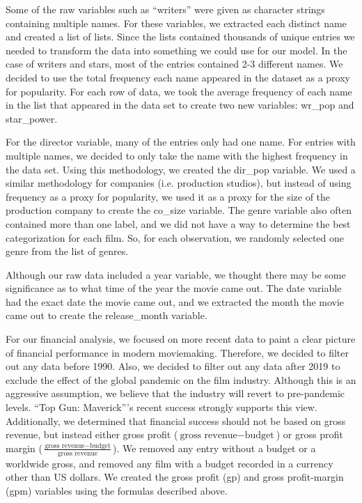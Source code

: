 \documentclass[10pt]{article}
\begin{document}
Some of the raw variables such as “writers” were given as character strings containing multiple names. For these variables, we extracted each distinct name and created a list of lists. Since the lists contained thousands of unique entries we needed to transform the data into something we could use for our model. In the case of writers and stars, most of the entries contained 2-3 different names. We decided to use the total frequency each name appeared in the dataset as a proxy for popularity. For each row of data, we took the average frequency of each name in the list that appeared in the data set to create two new variables: wr\_pop and star\_power.

For the director variable, many of the entries only had one name. For entries with multiple names, we decided to only take the name with the highest frequency in the data set. Using this methodology, we created the dir\_pop variable. We used a similar methodology for companies (i.e. production studios), but instead of using frequency as a proxy for popularity, we used it as a proxy for the size of the production company to create the co\_size variable. The genre variable also often contained more than one label, and we did not have a way to determine the best categorization for each film. So, for each observation, we randomly selected one genre from the list of genres.

Although our raw data included a year variable, we thought there may be some significance as to what time of the year the movie came out. The date variable had the exact date the movie came out, and we extracted the month the movie came out to create the release\_month variable.

For our financial analysis, we focused on more recent data to paint a clear picture of financial performance in modern moviemaking. Therefore, we decided to filter out any data before 1990. Also, we decided to filter out any data after 2019 to exclude the effect of the global pandemic on the film industry. Although this is an aggressive assumption, we believe that the industry will revert to pre-pandemic levels. “Top Gun: Maverick”’s recent success strongly supports this view. Additionally, we determined that financial success should not be based on gross revenue, but instead either gross profit ($\text{gross revenue} - \text{budget}$) or gross profit margin ($\frac{\text{gross revenue} - \text{budget}}{\text{gross revenue}}$). We removed any entry without a budget or a worldwide gross, and removed any film with a budget recorded in a currency other than US dollars. We created the gross profit (gp) and gross profit-margin (gpm) variables using the formulas described above.
\end{document}
